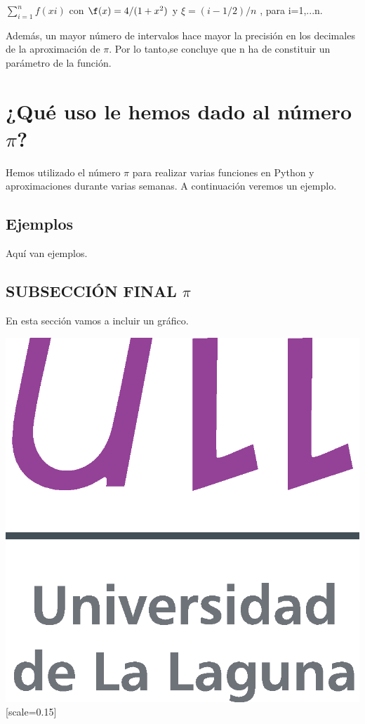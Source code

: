 \documentclass [12pt,a4paper]{article}  %
\begin{document}
$\sum_{i=1}^{n} f(xi)$ con $\f(x)= 4/(1+x^2)$ y $\xi=(i-1/2)/n $ , para i=1,...n.


Además, un mayor número de intervalos hace mayor la precisión en los decimales de la aproximación de $\pi$.
Por lo tanto,se concluye que n ha de constituir un parámetro de la función. 

\section{¿Qué uso le hemos dado al número $\pi$?} %

Hemos utilizado el número $\pi$ para realizar varias funciones en Python y aproximaciones durante varias semanas.
A continuación veremos un ejemplo.

\subsection{Ejemplos} 
 Aquí van ejemplos. 

\subsection{SUBSECCIÓN FINAL $\pi$} %
En esta sección vamos a incluir un gráfico.

\includegraphics{logo.eps}[scale=0.15]
\end{document}
